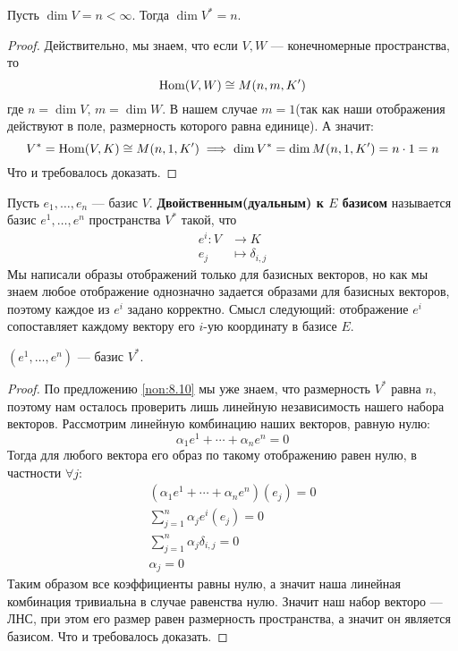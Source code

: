 \documentclass[../main.tex]{subfiles}
\begin{document}
\begin{theorem-non}
\label{non:8.10}
  Пусть $\dim V = n < \infty$. Тогда $\dim V^{*} = n$.
\end{theorem-non}
\begin{proof}
  Действительно, мы знаем, что если $V, W$ --- конечномерные пространства, то
  \begin{equation*}
    \operatorname{Hom}(V, W) \cong M(n, m, K')
  \end{equation*}
  где $n = \dim V,\, m = \dim W$. В нашем случае $m = 1$(так как наши отображения действуют в поле, размерность которого равна единице). А значит:
  \begin{equation*}
    V^{*} = \operatorname{Hom}(V, K) \cong M(n, 1, K') \implies \dim V^{*} = \dim M(n, 1, K') = n \cdot 1 = n
  \end{equation*}
  Что и требовалось доказать.
\end{proof}

\begin{definition}
  Пусть $e_1, \dotsc, e_n$ --- базис $V$. \textbf{Двойственным(дуальным) к $E$ базисом} называется базис $e^1, \dotsc, e^n$ пространства $V^{*}$ такой, что
  \begin{align*}
    e^i\colon V &\longrightarrow K \\
    e_j &\longmapsto \delta_{i,j}
  \end{align*}
  Мы написали образы отображений только для базисных векторов, но как мы знаем любое отображение однозначно задается образами для базисных векторов, поэтому каждое из $e^i$ задано корректно. Смысл следующий: отображение $e^i$ сопоставляет каждому вектору его $i$-ую координату в базисе $E$.
\end{definition}

\pagebreak
\begin{theorem-non}
  $(e^1, \dotsc, e^n)$ --- базис $V^{*}$.
\end{theorem-non}
\begin{proof}
  По предложению \ref{non:8.10} мы уже знаем, что размерность $V^{*}$ равна $n$, поэтому нам осталось проверить лишь линейную независимость нашего набора векторов. Рассмотрим линейную комбинацию наших векторов, равную нулю:
  \begin{equation*}
    \alpha_1 e^1 + \dotsb + \alpha_n e^n = 0
  \end{equation*}
  Тогда для любого вектора его образ по такому отображению равен нулю, в частности $\forall j$:
  \begin{equation*}
    \begin{gathered}
      (\alpha_1 e^1 + \dotsb + \alpha_n e^n)(e_j) = 0 \\
      \sum\limits_{j = 1}^{n} \alpha_j e^{i}(e_j) = 0 \\
      \sum\limits_{j = 1}^{n} \alpha_j \delta_{i, j} = 0\\
      \alpha_j = 0
    \end{gathered}
  \end{equation*}
  Таким образом все коэффициенты равны нулю, а значит наша линейная комбинация тривиальна в случае равенства нулю. Значит наш набор векторо --- ЛНС, при этом его размер равен размерность пространства, а значит он является базисом. Что и требовалось доказать.
\end{proof}
\end{document}
